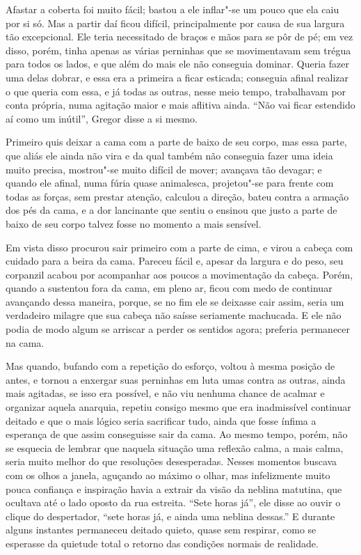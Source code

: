 Afastar a coberta foi muito fácil; bastou a ele inflar"-se um pouco que ela
caiu por si só. Mas a partir daí ficou difícil, principalmente por causa
de sua largura tão excepcional. Ele teria necessitado de braços e mãos
para se pôr de pé; em vez disso, porém, tinha apenas as várias perninhas
que se movimentavam sem trégua para todos os lados, e que além do mais ele
não conseguia dominar. Queria fazer uma delas dobrar, e essa era a
primeira a ficar esticada; conseguia afinal realizar o que queria com
essa, e já todas as outras, nesse meio tempo, trabalhavam por conta
própria, numa agitação maior e mais aflitiva ainda. “Não vai ficar
estendido aí como um inútil”, Gregor disse a si mesmo.

Primeiro quis deixar a cama com a parte de baixo de seu corpo, mas essa
parte, que aliás ele ainda não vira e da qual também não conseguia fazer
uma ideia muito precisa, mostrou"-se muito difícil de mover; avançava tão
devagar; e quando ele afinal, numa fúria quase animalesca, projetou"-se
para frente com todas as forças, sem prestar atenção, calculou a direção, bateu contra a armação dos pés da cama, e a dor
lancinante que sentiu o ensinou que justo a parte de baixo de seu corpo
talvez fosse no momento a mais sensível.

Em vista disso procurou sair primeiro com a parte de cima, e virou a
cabeça com cuidado para a beira da cama. Pareceu fácil e, apesar da
largura e do peso, seu corpanzil acabou por acompanhar aos poucos a
movimentação da cabeça. Porém, quando a sustentou fora da cama, em pleno
ar, ficou com medo de continuar avançando dessa maneira, porque, se no fim
ele se deixasse cair assim, seria um verdadeiro milagre que sua cabeça não
saísse seriamente machucada. E ele não podia de modo algum se arriscar a
perder os sentidos agora; preferia permanecer na cama.

Mas quando, bufando com a repetição do esforço, voltou à mesma posição de
antes, e tornou a enxergar suas perninhas em luta umas contra as outras,
ainda mais agitadas, se isso era possível, e não viu nenhuma chance de
acalmar e organizar aquela anarquia, repetiu consigo mesmo que era
inadmissível continuar deitado e que o mais lógico seria sacrificar tudo,
ainda que fosse ínfima a esperança de que assim conseguisse sair da cama.
Ao mesmo tempo, porém, não se esquecia de lembrar que naquela situação uma
reflexão calma, a mais calma, seria muito melhor do que resoluções
desesperadas. Nesses momentos buscava com os olhos a janela, aguçando ao
máximo o olhar, mas infelizmente muito pouca confiança e inspiração havia
a extrair da visão da neblina matutina, que ocultava até o lado oposto da
rua estreita. “Sete horas já”, ele disse ao ouvir o clique do despertador,
“sete horas já, e ainda uma neblina dessas.” E durante alguns instantes
permaneceu deitado quieto, quase sem respirar, como se esperasse da
quietude total o retorno das condições normais de realidade.

